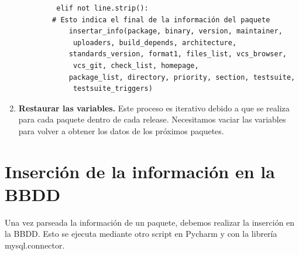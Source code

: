 \documentclass[a4paper, 12pt]{book}
\begin{document}
\begin{enumerate}
	\begin{verbatim}
		 elif not line.strip():
		# Esto indica el final de la información del paquete
			insertar_info(package, binary, version, maintainer,
			 uploaders, build_depends, architecture,
			standards_version, format1, files_list, vcs_browser,
			 vcs_git, check_list, homepage,
			package_list, directory, priority, section, testsuite,
			 testsuite_triggers)
	\end{verbatim}
	
		\item \textbf{Restaurar las variables.} Este proceso es iterativo debido a que se realiza para cada paquete dentro de cada release. Necesitamos vaciar las variables para volver a obtener los datos de los próximos paquetes.
		
\end{enumerate}

\section{Inserción de la información en la BBDD}
\label{sec:insercion_BBDD}
Una vez parseada la información de un paquete, debemos realizar la inserción en la BBDD. Esto se ejecuta mediante otro script en Pycharm y con la librería mysql.connector.
\end{document}
